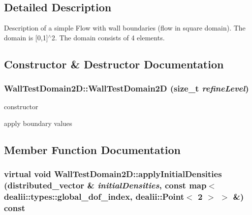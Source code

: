 \subsection{Detailed Description}
Description of a simple Flow with wall boundaries (flow in square domain). The domain is \mbox{[}0,1\mbox{]}$^\wedge$2. The domain consists of 4 elements. 

\subsection{Constructor \& Destructor Documentation}
\hypertarget{classWallTestDomain2D_ae2a5588bd00b23f67587f5030520daca}{
\subsubsection[{WallTestDomain2D}]{\setlength{\rightskip}{0pt plus 5cm}WallTestDomain2D::WallTestDomain2D (size\_\-t {\em refineLevel})}}
\label{classWallTestDomain2D_ae2a5588bd00b23f67587f5030520daca}


constructor 

apply boundary values 

\subsection{Member Function Documentation}
\hypertarget{classWallTestDomain2D_af8d57a6c29029514a2f2d09547f7fba1}{
\subsubsection[{applyInitialDensities}]{\setlength{\rightskip}{0pt plus 5cm}virtual void WallTestDomain2D::applyInitialDensities (distributed\_\-vector \& {\em initialDensities}, \/  const map$<$ dealii::types::global\_\-dof\_\-index, dealii::Point$<$ 2 $>$ $>$ \&) const}}
\label{classWallTestDomain2D_af8d57a6c29029514a2f2d09547f7fba1}


